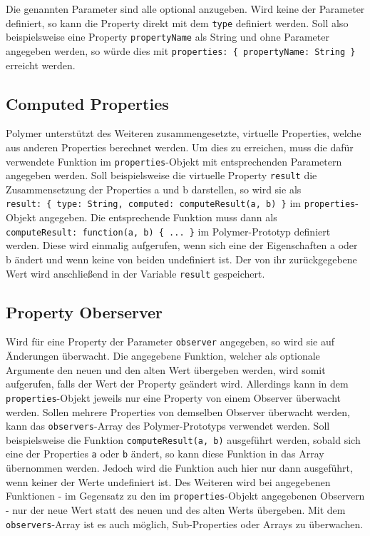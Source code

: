 Die genannten Parameter sind alle optional anzugeben. Wird keine der Parameter definiert, so kann die Property direkt mit dem \texttt{type} definiert werden. Soll also beispielsweise eine Property \texttt{propertyName} als String und ohne Parameter angegeben werden, so würde dies mit \texttt{properties:\ \{\ propertyName:\ String\ \}} erreicht werden.


\subsection{Computed Properties}\label{computed-properties}

Polymer unterstützt des Weiteren zusammengesetzte, virtuelle Properties, welche aus anderen Properties berechnet werden. Um dies zu erreichen, muss die dafür verwendete Funktion im \texttt{properties}-Objekt mit entsprechenden Parametern angegeben werden. Soll beispielsweise die virtuelle Property \texttt{result} die Zusammensetzung der Properties a und b darstellen, so wird sie als \texttt{result:\ \{\ type:\ String,\ computed:\ computeResult(a,\ b)\ \}} im \texttt{properties}-Objekt angegeben. Die entsprechende Funktion muss dann als \texttt{computeResult:\ function(a,\ b)\ \{\ ...\ \}} im Polymer-Prototyp definiert werden. Diese wird einmalig aufgerufen, wenn sich eine der Eigenschaften a oder b ändert und wenn keine von beiden undefiniert ist. Der von ihr zurückgegebene Wert wird anschließend in der Variable \texttt{result} gespeichert.


\subsection{Property Oberserver}\label{property-oberserver}

Wird für eine Property der Parameter \texttt{observer} angegeben, so wird sie auf Änderungen überwacht. Die angegebene Funktion, welcher als optionale Argumente den neuen und den alten Wert übergeben werden, wird somit aufgerufen, falls der Wert der Property geändert wird. Allerdings kann in dem \texttt{properties}-Objekt jeweils nur eine Property von einem Observer überwacht werden. Sollen mehrere Properties von demselben Observer überwacht werden, kann das \texttt{observers}-Array des Polymer-Prototyps verwendet werden. Soll beispielsweise die Funktion \texttt{computeResult(a,\ b)} ausgeführt werden, sobald sich eine der Properties \texttt{a} oder \texttt{b} ändert, so kann diese Funktion in das Array übernommen werden. Jedoch wird die Funktion auch hier nur dann ausgeführt, wenn keiner der Werte undefiniert ist. Des Weiteren wird bei angegebenen Funktionen - im Gegensatz zu den im \texttt{properties}-Objekt angegebenen Observern - nur der neue Wert statt des neuen und des alten Werts übergeben. Mit dem \texttt{observers}-Array ist es auch möglich, Sub-Properties oder Arrays zu überwachen.

